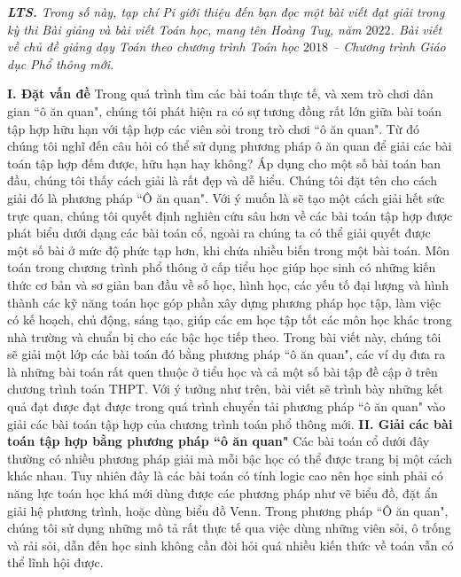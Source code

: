\textit{\textbf{\color{diendantoanhoc}LTS.} Trong số này, tạp chí Pi giới thiệu đến bạn đọc một bài viết đạt giải trong kỳ thi Bài giảng và bài viết Toán học, mang tên Hoàng Tuỵ, năm $2022$. Bài viết về chủ đề giảng dạy Toán theo chương trình Toán học $2018$ -- Chương trình Giáo dục Phổ thông mới.}
\begin{multicols}{2}
	\textbf{\color{diendantoanhoc}I.	Đặt vấn đề}
	\vskip 0.1cm
	Trong quá trình tìm các bài toán thực tế, và xem trò chơi dân gian ``ô ăn quan", chúng tôi phát hiện ra có sự tương đồng rất lớn giữa bài toán tập hợp hữu hạn với tập hợp các viên sỏi trong trò chơi ``ô ăn quan". Từ đó chúng tôi nghĩ đến câu hỏi có thể sử dụng phương pháp ô ăn quan để giải các bài toán tập hợp đếm được, hữu hạn hay không? Áp dụng cho một số bài toán ban đầu, chúng tôi thấy cách giải là rất đẹp và dễ hiểu. Chúng tôi đặt tên cho cách giải đó là phương pháp ``Ô ăn quan".
	\vskip 0.1cm
	Với ý muốn là sẽ tạo một cách giải hết sức trực quan, chúng tôi quyết định nghiên cứu sâu hơn về các bài toán tập hợp được phát biểu dưới dạng các bài toán cổ, ngoài ra chúng ta có thể giải quyết được một số bài ở mức độ phức tạp hơn, khi chứa nhiều biến trong một bài toán.
	\vskip 0.1cm
	Môn toán trong chương trình phổ thông ở cấp tiểu học giúp học sinh có những kiến thức cơ bản và sơ giản ban đầu về số học, hình học, các yếu tố đại lượng và hình thành các kỹ năng toán học góp phần xây dựng phương pháp học tập, làm việc có kế hoạch, chủ động, sáng tạo, giúp các em học tập tốt các môn học khác trong nhà trường và chuẩn bị cho các bậc học tiếp theo. Trong bài viết này, chúng tôi sẽ giải một lớp các bài toán đó bằng phương pháp ``ô ăn quan", các ví dụ đưa ra là những bài toán rất quen thuộc ở tiểu học và cả một số bài tập đề cập ở trên chương trình toán THPT.
	\vskip 0.1cm
	Với ý tưởng như trên, bài viết sẽ trình bày những kết quả đạt được đạt được trong quá trình chuyển tải phương pháp ``ô ăn quan" vào giải các bài toán tập hợp của chương trình toán phổ thông mới.
	\vskip 0.1cm
	\textbf{\color{diendantoanhoc}II.	Giải các bài toán tập hợp bằng phương pháp ``ô ăn quan"}
	\vskip 0.1cm
	Các bài toán cổ dưới đây thường có nhiều phương pháp giải mà mỗi bậc học có thể được trang bị một cách khác nhau. Tuy nhiên đây là các bài toán có tính logic cao nên học sinh phải có năng lực toán học khá mới dùng được các phương pháp như vẽ biểu đồ, đặt ẩn giải hệ phương trình, hoặc dùng biểu đồ Venn. Trong phương pháp ``Ô ăn quan", chúng tôi sử dụng những mô tả rất thực tế qua việc dùng những viên sỏi, ô trống và rải sỏi, dẫn đến học sinh không cần đòi hỏi quá nhiều kiến thức về toán vẫn có thể lĩnh hội được.

\end{multicols}
